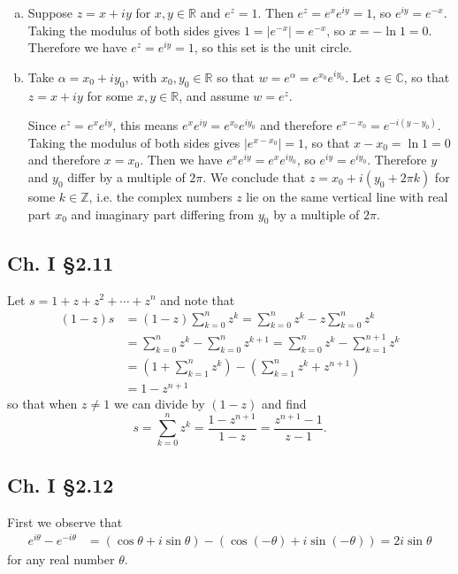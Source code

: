 \documentclass{article}
\begin{document}
\begin{enumerate}[(a)]
  \item{
    Suppose $z = x + iy$ for $x, y \in \mathbb{R}$ and $e^z = 1$. Then
    $e^z = e^x e^{iy} = 1$, so $e^{iy} = e^{-x}$. Taking the modulus of both sides
    gives $1 = |e^{-x}| = e^{-x}$, so $x = -\ln 1 = 0$. Therefore we have
    $e^z = e^{iy} = 1$, so this set is the unit circle.
  }
  \item{
    Take $\alpha = x_0 + i y_0$, with $x_0, y_0 \in \mathbb{R}$
    so that $w = e^\alpha = e^{x_0} e^{iy_0}$.
    Let $z \in \mathbb{C}$, so that $z = x + iy$ for some
    $x, y \in \mathbb{R}$, and assume $w = e^z$.

    Since $e^z = e^x e^{iy}$, this means
    $e^x e^{iy} = e^{x_0} e^{iy_0}$ and therefore
    $e^{x - x_0} = e^{-i(y - y_0)}$. Taking the modulus of
    both sides gives $|e^{x - x_0}| = 1$, so that
    $x - x_0 = \ln 1 = 0$ and therefore $x = x_0$.
    Then we have $e^x e^{iy} = e^x e^{iy_0}$, so
    $e^{iy} = e^{iy_0}$. Therefore $y$ and $y_0$ differ by
    a multiple of $2\pi$. We conclude that
    $z = x_0 + i(y_0 + 2\pi k)$ for some $k \in \mathbb{Z}$,
    i.e. the complex numbers $z$ lie on the same vertical line
    with real part $x_0$ and imaginary part differing from $y_0$
    by a multiple of $2\pi$.
  }
\end{enumerate}


\subsection*{Ch. I \S 2.11}
Let $s = 1 + z + z^2 + \cdots + z^n$ and note that
\begin{align*}
   (1 - z)s
&= (1 - z)\sum_{k=0}^n z^k
 = \sum_{k=0}^n z^k - z\sum_{k=0}^n z^k \\
&= \sum_{k=0}^n z^k - \sum_{k=0}^n z^{k+1}
 = \sum_{k=0}^n z^k - \sum_{k=1}^{n+1} z^{k} \\
&= \left(1 + \sum_{k=1}^n z^k\right) - \left(\sum_{k=1}^n z^k +
  z^{n+1}\right) \\
&= 1 - z^{n+1}
\end{align*}
so that when $z \neq 1$ we can divide by $(1 - z)$ and find
$$
  s
= \sum_{k=0}^n z^k = \frac{1 - z^{n+1}}{1 - z}
= \frac{z^{n+1} - 1}{z - 1}.
$$

\subsection*{Ch. I \S 2.12}
First we observe that
\begin{align*}
    e^{i \theta} - e^{-i \theta}
&= (\cos \theta + i \sin \theta) - (\cos(-\theta) + i \sin(-\theta))
 = 2i \sin \theta
\end{align*}
for any real number $\theta$.
\end{document}
